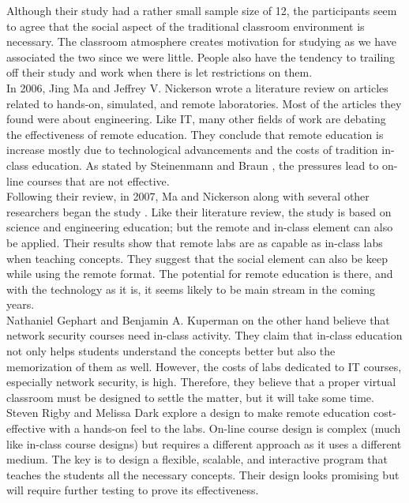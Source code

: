 \documentclass[titlepage]{article}
\begin{document}
\noindent Although their study had a rather small sample size of 12, the participants seem to agree that
the social aspect of the traditional classroom environment is necessary.  The classroom
atmosphere creates motivation for studying as we have associated the two since we were
little.  People also have the tendency to trailing off their study and work when there is
let restrictions on them.\\

\noindent In 2006, Jing Ma and Jeffrey V. Nickerson \cite{2} wrote a literature review on articles
related to hands-on, simulated, and remote laboratories.  Most of the articles they found were about
engineering.  Like IT, many other fields of work are debating the effectiveness of remote education.
They conclude that remote education is increase mostly due to technological advancements and the
costs of tradition in-class education.  As stated by Steinenmann and Braun \cite{1}, the pressures
lead to on-line courses that are not effective.\\

\noindent Following their review, in 2007, Ma and Nickerson along with several other
researchers began the study \cite{3}.  Like their literature review, the study is based on science and
engineering education; but the remote and in-class element can also be applied.  Their results show that
remote labs are as capable as in-class labs when teaching concepts.  They suggest that the social
element can also be keep while using the remote format.  The potential for remote education is there,
and with the technology as it is, it seems likely to be main stream in the coming years.\\

\noindent Nathaniel Gephart and Benjamin A. Kuperman \cite{4} on the other hand believe that
network security courses need in-class activity.  They claim that in-class education not only helps
students understand the concepts better but also the memorization of them as well.  However, the
costs of labs dedicated to IT courses, especially network security, is high.  Therefore, they believe
that a proper virtual classroom must be designed to settle the matter, but it will take some time.\\

\noindent Steven Rigby and Melissa Dark \cite{5} explore a design to make remote education
cost-effective with a hands-on feel to the labs.  On-line course design is complex (much like
in-class course designs) but requires a different approach as it uses a different medium.  The
key is to design a flexible, scalable, and interactive program that teaches the students all the
necessary concepts.  Their design looks promising but will require further testing to prove
its effectiveness.\\
\end{document}
